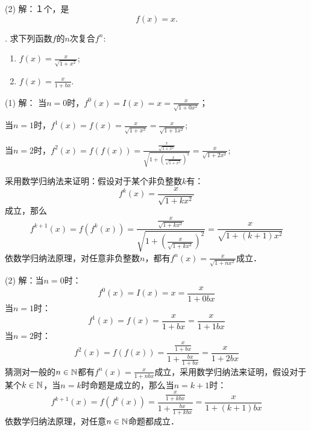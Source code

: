 \noindent (2) 解：１个，是
\begin{equation}
    f(x) = x.
\end{equation}

. 求下列函数$f$的$n$次复合$f^n$:

\begin{enumerate}
    \item $f(x) = \displaystyle\frac{x}{\displaystyle\sqrt{1+x^2}}$;
    \item $f(x) = \displaystyle\frac{x}{1+bx}$.
\end{enumerate}

\noindent (1) 解：
当$n = 0$时，$f^0 (x) = I (x) = x = \displaystyle\frac{x}{\displaystyle\sqrt{1+0 x^2}}$；

\noindent 当$n=1$时，$f^1 (x) = f(x) = \displaystyle\frac{x}{\displaystyle\sqrt{1+x^2}}=\displaystyle\frac{x}{\displaystyle\sqrt{1+1 x^2}}$;

\noindent 当$n=2$时，$f^2 (x) = f(f(x)) = \displaystyle\frac{\displaystyle\frac{x}{\displaystyle\sqrt{1+x^2}}}{\displaystyle\sqrt{1+\left(\displaystyle\frac{x}{\displaystyle\sqrt{1+x^2}}\right)^2}} = \displaystyle\frac{x}{\displaystyle\sqrt{1+2x^2}}$;

\noindent 采用数学归纳法来证明：假设对于某个非负整数$k$有：
\begin{equation}
    f^k (x) = \frac{x}{\sqrt{1+kx^2}}
\end{equation}
成立，那么
\begin{equation}
    f^{k+1}(x) = f(f^k(x)) = \frac{\displaystyle\frac{x}{\sqrt{1+kx^2}}}{\sqrt{1+\left(\displaystyle\frac{x}{\sqrt{1+kx^2}}\right)^2}} = \frac{x}{\sqrt{1+(k+1)x^2}}
\end{equation}
依数学归纳法原理，对任意非负整数$n$，都有$f^n (x) = \displaystyle\frac{x}{\displaystyle\sqrt{1+nx^2}}$成立．

\noindent (2) 解：当$n=0$时：
\begin{equation}
    f^0 (x) = I(x) = x = \frac{x}{1 + 0bx}
\end{equation}
当$n=1$时：
\begin{equation}
    f^1 (x) = f(x) = \frac{x}{1+bx} = \frac{x}{1+1bx}
\end{equation}
当$n=2$时：
\begin{equation}
    f^2 (x) = f(f(x)) = \frac{\displaystyle\frac{x}{1+bx}}{1+\displaystyle\frac{bx}{1+bx}} = \displaystyle\frac{x}{1+2bx}
\end{equation}
猜测对一般的$n \in \mathbb{N}$都有$f^n (x) = \displaystyle\frac{x}{1+nbx}$成立，采用数学归纳法来证明，假设对于某个$k \in \mathbb{N}$，当$n=k$时命题是成立的，那么当$n=k+1$时：
\begin{equation}
    f^{k+1}(x) = f(f^k (x)) = \displaystyle\frac{\displaystyle\frac{x}{1+kbx}}{1+\displaystyle\frac{bx}{1+kbx}} = \displaystyle\frac{x}{1+(k+1)bx}
\end{equation}
依数学归纳法原理，对任意$n \in \mathbb{N}$命题都成立．


